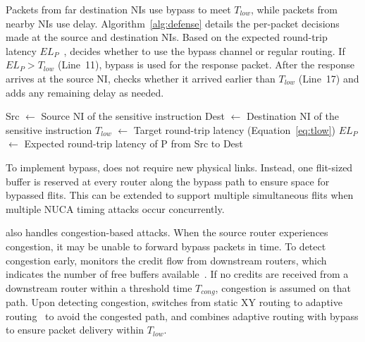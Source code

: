 Packets from far destination NIs use bypass to meet $T_{low}$, while packets from nearby NIs use delay.
Algorithm~\ref{alg:defense} details the per-packet decisions made at the source and destination NIs.
Based on the expected round-trip latency $EL_P$~\cite{xiang2016model}, \bscheme{} decides whether to use the bypass channel or regular routing.
If $EL_P > T_{low}$ (Line~11), bypass is used for the response packet.
After the response arrives at the source NI, \bscheme{} checks whether it arrived earlier than $T_{low}$ (Line~17) and adds any remaining delay as needed.

\begin{algorithm}[t]
\footnotesize
{}
    Src $\leftarrow$ Source NI of the sensitive instruction\;
    Dest $\leftarrow$ Destination NI of the sensitive instruction\;
    $T_{low}$ $\leftarrow$ Target round-trip latency (Equation~\ref{eq:tlow})\;
    $EL_P$ $\leftarrow$ Expected round-trip latency of P from Src to Dest\;
\caption{\bscheme{} packet handling at the NI.}
\label{alg:defense}
\end{algorithm}

To implement bypass, \bscheme{} does not require new physical links.
Instead, one flit-sized buffer is reserved at every router along the bypass path to ensure space for bypassed flits.
This can be extended to support multiple simultaneous flits when multiple NUCA timing attacks occur concurrently.

\bscheme{} also handles congestion-based attacks.
When the source router experiences congestion, it may be unable to forward bypass packets in time.
To detect congestion early, \bscheme{} monitors the credit flow from downstream routers, which indicates the number of free buffers available~\cite{dally1993deadlock,kim2005low,gratz2008regional}.
If no credits are received from a downstream router within a threshold time $T_{cong}$, congestion is assumed on that path.
Upon detecting congestion, \bscheme{} switches from static XY routing to adaptive routing~\cite{duato2001general,gratz2008regional,kim2005low} to avoid the congested path, and combines adaptive routing with bypass to ensure packet delivery within $T_{low}$.


